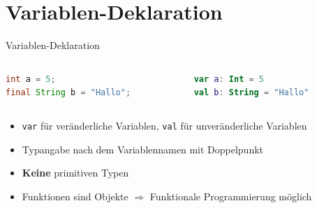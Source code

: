 \documentclass{beamer}
\begin{document}
\section{Variablen-Deklaration}
\begin{frame}[fragile]{Variablen-Deklaration}
  \begin{columns}
    \begin{column}{0.5\textwidth}
      \begin{lstlisting}[language=Java, title=Java, xleftmargin=1em]
int a = 5;
final String b = "Hallo";
      \end{lstlisting}
    \end{column}
    \begin{column}{0.5\textwidth}
      \begin{lstlisting}[language=Kotlin, title=Kotlin, xleftmargin=1em, numbers=none]
var a: Int = 5
val b: String = "Hallo"
      \end{lstlisting}
    \end{column}
  \end{columns}
  \vspace{0.5cm}
  \begin{itemize}[<+->]
    \item \texttt{var} für veränderliche Variablen, \texttt{val} für unveränderliche Variablen
    \item Typangabe nach dem Variablennamen mit Doppelpunkt
    \item \textbf{Keine} primitiven Typen %
    \item Funktionen sind Objekte $\Rightarrow$ Funktionale Programmierung möglich
  \end{itemize}
\end{frame}
\end{document}
